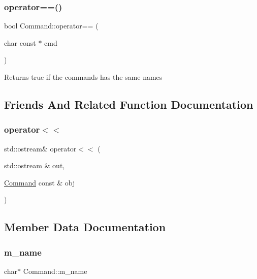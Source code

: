 \mbox{\label{classCommand_a75d6d67687c9d29e47ce9e80540bbd1e}} 
\subsubsection{\texorpdfstring{operator==()}{operator==()}}
{\footnotesize\ttfamily bool Command\+::operator== (\begin{DoxyParamCaption}\item[{char const $\ast$}]{cmd }\end{DoxyParamCaption})}

\begin{DoxyReturn}{Returns}
true if the commands has the same names 
\end{DoxyReturn}


\subsection{Friends And Related Function Documentation}
\mbox{\label{classCommand_a0a193e228644a3735c309d8b2b5b9899}} 
\subsubsection{\texorpdfstring{operator$<$$<$}{operator<<}}
{\footnotesize\ttfamily std\+::ostream\& operator$<$$<$ (\begin{DoxyParamCaption}\item[{std\+::ostream \&}]{out,  }\item[{\hyperlink{classCommand}{Command} const \&}]{obj }\end{DoxyParamCaption})\hspace{0.3cm}{\ttfamily [friend]}}



\subsection{Member Data Documentation}
\mbox{\label{classCommand_a381973cd5a4b999975c0f79e14245821}} 
\subsubsection{\texorpdfstring{m\+\_\+name}{m\_name}}
{\footnotesize\ttfamily char$\ast$ Command\+::m\+\_\+name\hspace{0.3cm}{\ttfamily [private]}}

